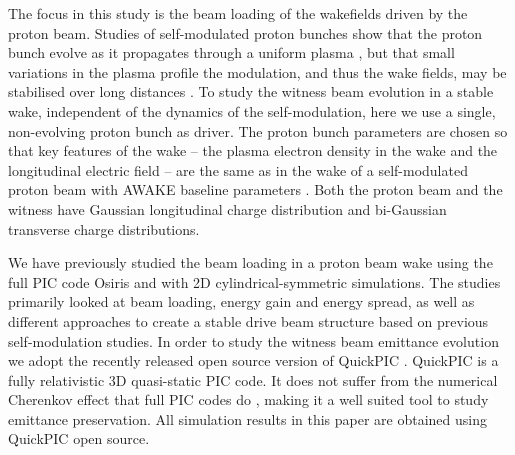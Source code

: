 \documentclass[aps,prstab,reprint,amsmath,amssymb,groupedaddress]{revtex4-1}
\begin{document}
The focus in this study is the beam loading of the wakefields driven by the proton beam. Studies of self-modulated
proton bunches show that the proton bunch evolve as it propagates through a uniform plasma \cite{lotov:2011}, but that
small variations in the plasma profile the modulation, and thus the wake fields, may be stabilised over long distances
\cite{lotov:2011, lotov:2015, caldwell:2011}. To study the witness beam evolution in a stable wake, independent of the
dynamics of the self-modulation, here we use a single, non-evolving proton bunch as driver. The proton bunch parameters
are chosen so that key features of the wake -- the plasma electron density in the wake and the longitudinal electric
field -- are the same as in the wake of a self-modulated proton beam with AWAKE baseline parameters
\cite{gschwendtner:2016}. Both the proton beam and the witness have Gaussian longitudinal charge distribution and
bi-Gaussian transverse charge distributions.

We have previously studied the beam loading in a proton beam wake using the full PIC code Osiris \cite{fonseca:2002}
and with 2D cylindrical-symmetric simulations. The studies \cite{berglyd_olsen:2015, berglyd_olsen:2016} primarily
looked at beam loading, energy gain and energy spread, as well as different approaches to create a stable drive beam
structure based on previous self-modulation studies. In order to study the witness beam emittance evolution we adopt the
recently released open source version of QuickPIC \cite{huang:2006, an:2013}. QuickPIC is a fully relativistic 3D
quasi-static PIC code. It does not suffer from the numerical Cherenkov effect that full PIC codes do
\cite{godfrey:1974,lehe:2013}, making it a well suited tool to study emittance preservation.  All simulation results in
this paper are obtained using QuickPIC open source.

\end{document}
